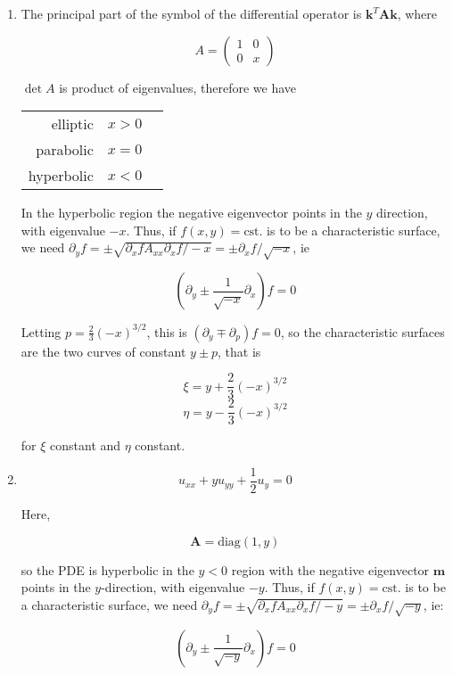 \documentclass[a4paper]{article}
\begin{document}
\begin{enumerate}
	\item The principal part of the symbol of the differential operator is $ \mathbf{k}^{T} \mathbf{A} \mathbf{k} $, where 

	\[ A = \begin{pmatrix}
	1 & 0 \\
	0 & x
	\end{pmatrix} \]
	
	$ \det A  $ is product of eigenvalues, therefore we have 
	
	\begin{center}
		\begin{tabular}{rll}
			elliptic  & $ x > 0  $ \\
			parabolic  &  $ x = 0 $  \\
			hyperbolic &  $ x < 0$ 
		\end{tabular}
	\end{center}

	In the hyperbolic region the negative eigenvector points in the $ y $ direction, with eigenvalue $ -x $. Thus, if $ f(x,y) = \text{cst.} $ is to be a characteristic surface, we need $ \partial_{y} f = \pm \sqrt{ \partial_{x} f  A_{xx} \partial_{x} f / -x } = \pm  \partial_{x} f / \sqrt{-x} $, ie
	
	
	\[ (\partial_{y} \pm \frac{1}{\sqrt{-x}} \partial_{x}  ) f = 0 \]
	
	
	Letting $ p = \frac{2}{3}(-x)^{3/2} $, this is $ (\partial_{y} \mp \partial_{p})f = 0 $, so the characteristic surfaces are the two curves of constant $ y \pm p $, that is
	
	\[ \xi = y + \frac{2}{3} (-x)^{3/2} \]
	\[ \eta = y - \frac{2}{3} (-x)^{3/2} \]
	
	for $ \xi $ constant and $ \eta $ constant.

	\item \[ u_{xx} + y u_{yy} + \frac{1}{2} u_{y} = 0 \]
	
	Here,
	
	\[ \mathbf{A} = \text{diag}(1,y) \]
	
	so the PDE is hyperbolic in the $ y < 0 $ region with the negative eigenvector $ \mathbf{m} $ points in the $ y $-direction, with eigenvalue $ -y $. Thus, if $ f(x,y) = \text{cst.} $ is to be a characteristic surface, we need $ \partial_{y} f = \pm \sqrt{ \partial_{x} f  A_{xx} \partial_{x} f / -y } = \pm \partial_{x} f / \sqrt{-y}  $, ie:
	
	
	\[ ( \partial_{y} \pm \frac{1}{\sqrt{-y}} \partial_{x}  ) f = 0  \]
	

\end{enumerate}
\end{document}
